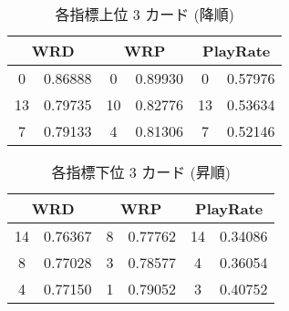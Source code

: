 \documentclass{jarticle}     %
\begin{document}
  \begin{table}[ht]
    \centering
    \caption{各指標上位 3 カード (降順)}
    \label{up3}
    \begin{tabular}{|cc|cc|cc|}
    \hline
    \multicolumn{2}{|c|}{WRD}          & \multicolumn{2}{c|}{WRP}          & \multicolumn{2}{c|}{PlayRate}     \\ \hline
    \multicolumn{1}{|c|}{0}  & 0.86888 & \multicolumn{1}{c|}{0}  & 0.89930 & \multicolumn{1}{c|}{0}  & 0.57976 \\ \hline
    \multicolumn{1}{|c|}{13} & 0.79735 & \multicolumn{1}{c|}{10} & 0.82776 & \multicolumn{1}{c|}{13} & 0.53634 \\ \hline
    \multicolumn{1}{|c|}{7}  & 0.79133 & \multicolumn{1}{c|}{4}  & 0.81306 & \multicolumn{1}{c|}{7}  & 0.52146 \\ \hline
    \end{tabular}
    \end{table}

  
\begin{table}[ht]
  \centering
  \caption{各指標下位 3 カード (昇順)}
  \label{bottom3}
  \begin{tabular}{|cc|cc|cc|}
  \hline
  \multicolumn{2}{|c|}{WRD}          & \multicolumn{2}{c|}{WRP}         & \multicolumn{2}{c|}{PlayRate}     \\ \hline
  \multicolumn{1}{|c|}{14} & 0.76367 & \multicolumn{1}{c|}{8} & 0.77762 & \multicolumn{1}{c|}{14} & 0.34086 \\ \hline
  \multicolumn{1}{|c|}{8}  & 0.77028 & \multicolumn{1}{c|}{3} & 0.78577 & \multicolumn{1}{c|}{4}  & 0.36054 \\ \hline
  \multicolumn{1}{|c|}{4}  & 0.77150 & \multicolumn{1}{c|}{1} & 0.79052 & \multicolumn{1}{c|}{3}  & 0.40752 \\ \hline
  \end{tabular}
  \end{table}
  
\end{document}
